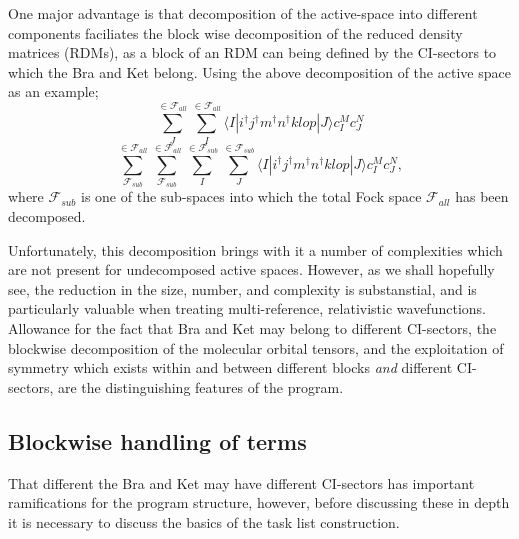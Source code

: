 \documentclass[12pt]{article}
\begin{document}
\noindent One major advantage is that decomposition of the active-space
into different components faciliates the block wise decomposition of the reduced density matrices (RDMs),
as a block of an RDM can being defined by the CI-sectors to 
which the Bra and Ket belong. Using the above decomposition of the 
active space as an example;
\begin{equation*}
\sum_{J}^{ \in \mathcal{F}_{all} }
\sum_{I}^{ \in \mathcal{F}_{all} } \langle I | i^{\dagger}j^{\dagger}m^{\dagger}n^{\dagger}klop | J \rangle c^{M}_{I} c_{J}^{N}
\end{equation*}
\begin{equation*}
\sum^{ \in \mathcal{F}_{all} }_{ \mathcal{F}_{sub} }
\sum^{ \in \mathcal{F}_{all} }_{ \mathcal{F}_{sub} }
\sum^{ \in \mathcal{F}_{sub}}_{I}
\sum^{ \in \mathcal{F}_{sub}}_{J} \langle I | i^{\dagger}j^{\dagger}m^{\dagger}n^{\dagger}klop | J \rangle c^{M}_{I} c_{J}^{N},
\end{equation*}
\noindent where $\mathcal{F}_{sub}$ is one of the sub-spaces into which the total Fock space $\mathcal{F}_{all}$ has been decomposed.

\noindent Unfortunately, this decomposition brings with it a number of
complexities which are not present for undecomposed active spaces. However, 
as we shall hopefully see, the reduction in the size, number, and complexity is
substanstial, and is particularly valuable when treating multi-reference,
relativistic wavefunctions.\\ 

\noindent Allowance for the fact that Bra and Ket may belong to different CI-sectors,
the blockwise decomposition of the molecular orbital tensors, and the exploitation 
of symmetry which exists within and between different blocks \emph{and}  different CI-sectors,
are the distinguishing features of the program.

\subsection{ Blockwise handling of terms } 
\noindent That different the Bra and Ket may have different CI-sectors has
important ramifications for the program structure, however, before discussing
these in depth it is necessary to discuss the basics of the task list
construction.\\
\end{document}
